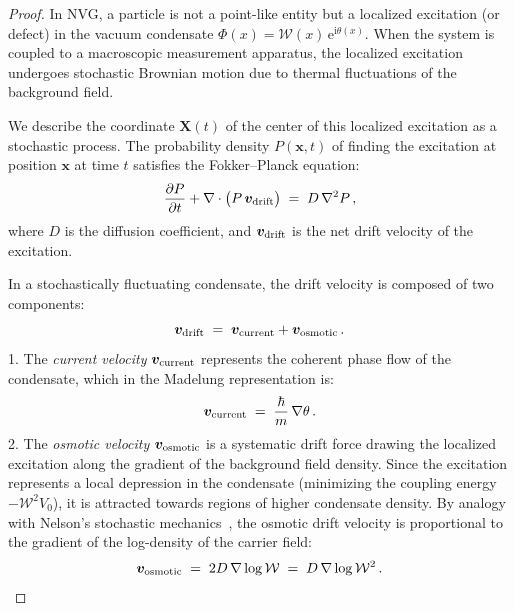 \documentclass[12pt,a4paper]{article}
\theoremstyle{plain}
\theoremstyle{definition}
\theoremstyle{remark}
\newcommand{\hb}{\hbar}
\newcommand{\Wc}{\mathcal{W}}
\newcommand{\ee}{\mathrm{e}}
\newcommand{\ii}{\mathrm{i}}
\begin{document}
\begin{proof}
In NVG, a particle is not a point-like entity but a localized excitation (or defect) in the vacuum condensate $\Phi(x) = \Wc(x)\,\ee^{\ii\theta(x)}$. When the system is coupled to a macroscopic measurement apparatus, the localized excitation undergoes stochastic Brownian motion due to thermal fluctuations of the background field. 

We describe the coordinate $\bm{X}(t)$ of the center of this localized excitation as a stochastic process. The probability density $P(\bm{x}, t)$ of finding the excitation at position $\bm{x}$ at time $t$ satisfies the Fokker--Planck equation:
\begin{equation}\label{eq:fokker}
  \frac{\partial P}{\partial t} + \nabla \cdot \bigl( P\,\bm{v}_{\rm drift} \bigr) \;=\; D\,\nabla^2 P\,,
\end{equation}
where $D$ is the diffusion coefficient, and $\bm{v}_{\rm drift}$ is the net drift velocity of the excitation.

In a stochastically fluctuating condensate, the drift velocity is composed of two components:
\begin{equation}\label{eq:drift}
  \bm{v}_{\rm drift} \;=\; \bm{v}_{\rm current} + \bm{v}_{\rm osmotic}\,.
\end{equation}
1. The \emph{current velocity} $\bm{v}_{\rm current}$ represents the coherent phase flow of the condensate, which in the Madelung representation is:
\begin{equation}
  \bm{v}_{\rm current} \;=\; \frac{\hb}{m}\,\nabla\theta\,.
\end{equation}
2. The \emph{osmotic velocity} $\bm{v}_{\rm osmotic}$ is a systematic drift force drawing the localized excitation along the gradient of the background field density. Since the excitation represents a local depression in the condensate (minimizing the coupling energy $-\Wc^2 V_0$), it is attracted towards regions of higher condensate density. By analogy with Nelson's stochastic mechanics~\cite{Nelson1966}, the osmotic drift velocity is proportional to the gradient of the log-density of the carrier field:
\begin{equation}\label{eq:osmotic}
  \bm{v}_{\rm osmotic} \;=\; 2D\,\nabla\log\Wc \;=\; D\,\nabla\log\Wc^2\,.
\end{equation}


\end{proof}
\end{document}
